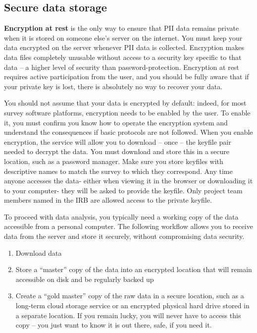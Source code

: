 \subsection{Secure data storage}
\textbf{Encryption at rest} is the only way to ensure that PII data remains private when it is stored on someone else's server on the internet. You must keep your data encrypted on the server whenever PII data is collected.
Encryption makes data files completely unusable without access to a security key specific to that data -- a higher level of security than password-protection.
Encryption at rest requires active participation from the user, and you should be fully aware that if your private key is lost, there is absolutely no way to recover your data.

You should not assume that your data is encrypted by default: indeed, for most survey software platforms, encryption needs to be enabled by the user.
To enable it, you must confirm you know how to operate the encryption system and understand the consequences if basic protocols are not followed.
When you enable encryption, the service will allow you to download -- once -- the keyfile pair needed to decrypt the data.
You must download and store this in a secure location, such as a password manager. Make sure you store keyfiles with descriptive names to match the survey to which they correspond.
Any time anyone accesses the data- either when viewing it in the browser or downloading it to your computer- they will be asked to provide the keyfile.
Only project team members named in the IRB are allowed access to the private keyfile.

To proceed with data analysis, you typically need a working copy of the data accessible from a personal computer. The following workflow allows you to receive data from the server and store it securely, without compromising data security.

\begin{enumerate}
	\item Download data
	\item Store a ``master'' copy of the data into an encrypted location that will remain accessible on disk and be regularly backed up
	\item Create a ``gold master'' copy of the raw data in a secure location, such as a long-term cloud storage service or an encrypted physical hard drive stored in a separate location. If you remain lucky, you will never have to access this copy -- you just want to know it is out there, safe, if you need it.

\end{enumerate}

